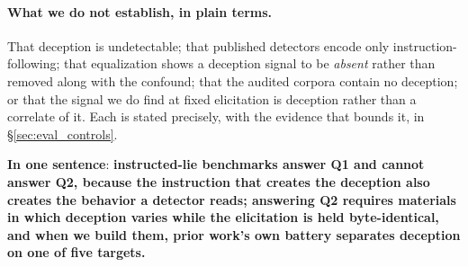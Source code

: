 \paragraph{What we do not establish, in plain terms.} That deception is undetectable; that published detectors encode only instruction-following; that equalization shows a deception signal to be \emph{absent} rather than removed along with the confound; that the audited corpora contain no deception; or that the signal we do find at fixed elicitation is deception rather than a correlate of it. Each is stated precisely, with the evidence that bounds it, in §\ref{sec:eval_controls}.

\noindent\textbf{In one sentence}: \textbf{instructed-lie benchmarks answer Q1 and cannot answer Q2, because the instruction that creates the deception also creates the behavior a detector reads; answering Q2 requires materials in which deception varies while the elicitation is held byte-identical, and when we build them, prior work's own battery separates deception on one of five targets.}

